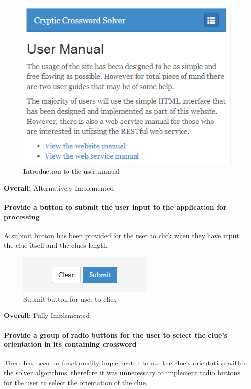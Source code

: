 \begin{figure}[H]
	\centering
	\includegraphics[keepaspectratio=true]{evidence/manual.png}
	\caption{Introduction to the user manual}
\end{figure}

{\bf Overall:} Alternatively Implemented


\paragraph{Provide a button to submit the user input to the application for
processing}

A submit button has been provided for the user to click when they have input
the clue itself and the clues length.

\begin{figure}[H]
	\centering
	\includegraphics[keepaspectratio=true]{evidence/submit.png}
	\caption{Submit button for user to click}
\end{figure}

{\bf Overall:} Fully Implemented


\paragraph{Provide a group of radio buttons for the user to select the clue's
orientation in its containing crossword}

There has been no functionality implemented to use the clue's orientation
within the solver algorithms, therefore it was unnecessary to implement radio
buttons for the user to select the orientation of the clue.

